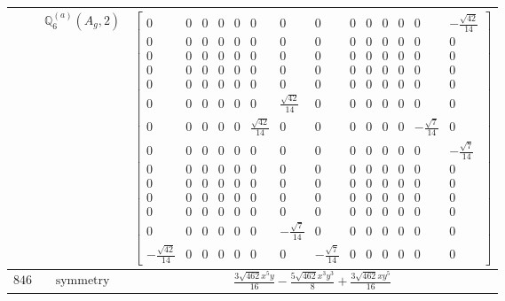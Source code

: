 \documentclass[fleqn,8pt,landscape]{jsarticle}
\begin{document}
\begin{longtable}{ccc}
$  $ & $ \mathbb{Q}_{6}^{(a)}(A_{g},2) $ & $ \begin{bmatrix} 0 & 0 & 0 & 0 & 0 & 0 & 0 & 0 & 0 & 0 & 0 & 0 & 0 & - \frac{\sqrt{42}}{14} \\ 0 & 0 & 0 & 0 & 0 & 0 & 0 & 0 & 0 & 0 & 0 & 0 & 0 & 0 \\ 0 & 0 & 0 & 0 & 0 & 0 & 0 & 0 & 0 & 0 & 0 & 0 & 0 & 0 \\ 0 & 0 & 0 & 0 & 0 & 0 & 0 & 0 & 0 & 0 & 0 & 0 & 0 & 0 \\ 0 & 0 & 0 & 0 & 0 & 0 & 0 & 0 & 0 & 0 & 0 & 0 & 0 & 0 \\ 0 & 0 & 0 & 0 & 0 & 0 & \frac{\sqrt{42}}{14} & 0 & 0 & 0 & 0 & 0 & 0 & 0 \\ 0 & 0 & 0 & 0 & 0 & \frac{\sqrt{42}}{14} & 0 & 0 & 0 & 0 & 0 & 0 & - \frac{\sqrt{7}}{14} & 0 \\ 0 & 0 & 0 & 0 & 0 & 0 & 0 & 0 & 0 & 0 & 0 & 0 & 0 & - \frac{\sqrt{7}}{14} \\ 0 & 0 & 0 & 0 & 0 & 0 & 0 & 0 & 0 & 0 & 0 & 0 & 0 & 0 \\ 0 & 0 & 0 & 0 & 0 & 0 & 0 & 0 & 0 & 0 & 0 & 0 & 0 & 0 \\ 0 & 0 & 0 & 0 & 0 & 0 & 0 & 0 & 0 & 0 & 0 & 0 & 0 & 0 \\ 0 & 0 & 0 & 0 & 0 & 0 & 0 & 0 & 0 & 0 & 0 & 0 & 0 & 0 \\ 0 & 0 & 0 & 0 & 0 & 0 & - \frac{\sqrt{7}}{14} & 0 & 0 & 0 & 0 & 0 & 0 & 0 \\ - \frac{\sqrt{42}}{14} & 0 & 0 & 0 & 0 & 0 & 0 & - \frac{\sqrt{7}}{14} & 0 & 0 & 0 & 0 & 0 & 0 \end{bmatrix} $ \\ \hline
$ 846 $ & $ \text{symmetry} $ & $ \frac{3 \sqrt{462} x^{5} y}{16} - \frac{5 \sqrt{462} x^{3} y^{3}}{8} + \frac{3 \sqrt{462} x y^{5}}{16} $ \\

\end{longtable}
\end{document}
